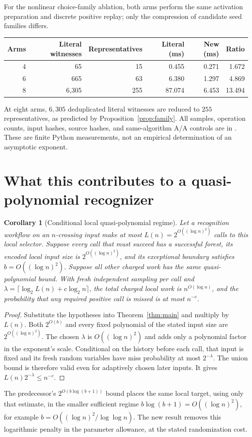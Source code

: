 \documentclass[11pt,letterpaper]{article}
\newtheorem{corollary}[theorem]{Corollary}
\theoremstyle{definition}
\begin{document}
For the nonlinear choice-family ablation, both arms perform the same
activation preparation and discrete positive replay; only the compression
of candidate seed families differs.

\begin{center}\small\setlength{\tabcolsep}{5pt}
\begin{tabular}{rrrrrr}\toprule
Arms & Literal witnesses & Representatives & Literal (ms) & New (ms) & Ratio\\\midrule
4 & 65 & 15 & 0.455 & 0.271 & 1.672\\
6 & 665 & 63 & 6.380 & 1.297 & 4.869\\
8 & 6,305 & 255 & 87.074 & 6.453 & 13.494\\
\bottomrule\end{tabular}\end{center}

At eight arms, $6,305$ deduplicated literal witnesses are reduced to $255$
representatives, as predicted by Proposition~\ref{prop:family}. All samples,
operation counts, input hashes, source hashes, and same-algorithm A/A
controls are in . These are finite Python
measurements, not an empirical determination of an asymptotic exponent.

\section{What this contributes to a quasi-polynomial recognizer}\label{sec:qp}
\begin{corollary}[Conditional local quasi-polynomial regime]\label{cor:qp}
Let a recognition workflow on an $n$-crossing input make at most
$L(n)=2^{O((\log n)^2)}$ calls to this local selector. Suppose every call
that must succeed has a successful forest, its encoded local input size is
$2^{O((\log n)^2)}$, and its exceptional boundary satisfies
$b=O((\log n)^2)$. Suppose all other charged work has the same
quasi-polynomial bound. With fresh independent sampling per call and
$\lambda=\lceil\log_2L(n)+c\log_2 n\rceil$, the total charged local
work is $n^{O(\log n)}$, and the probability that any required positive
call is missed is at most $n^{-c}$.
\end{corollary}
\begin{proof}
Substitute the hypotheses into Theorem~\ref{thm:main} and multiply by
$L(n)$. Both $2^{O(b)}$ and every fixed polynomial of the stated input size
are $2^{O((\log n)^2)}$. The chosen $\lambda$ is $O((\log n)^2)$ and
adds only a polynomial factor in the exponent's scale. Conditional on the
history before each call, that input is fixed and its fresh random variables
have miss probability at most $2^{-\lambda}$. The union bound is therefore
valid even for adaptively chosen later inputs. It gives
$L(n)2^{-\lambda}\leq n^{-c}$.
\end{proof}
The predecessor's $2^{O(b\log(b+1))}$ bound places the same local target,
using only that estimate, in the smaller sufficient regime
$b\log(b+1)=O((\log n)^2)$, for example
$b=O((\log n)^2/\log\log n)$. The new result removes this logarithmic
penalty in the parameter allowance, at the stated randomization cost.
\end{document}
